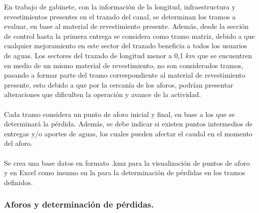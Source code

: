 \documentclass[]{article}
\begin{document}
En trabajo de gabinete, con la información de la longitud, infraestructura y revestimientos presentes en el trazado del canal, se determinan los tramos a evaluar, en base al material de revestimiento presente. Además, desde la sección de control hasta la primera entrega se considera como tramo matriz, debido a que cualquier mejoramiento en este sector del trazado beneficia a todos los usuarios de aguas. Los sectores del trazado de longitud menor a 0,1 $km$ que se encuentren en medio de un mismo material de revestimiento, no son considerados tramos, pasando a formar parte del tramo correspondiente al material de revestimiento presente, esto debido a que por la cercanía de los aforos, podrían presentar alteraciones que dificulten la operación y avance de la actividad. \\
\\
Cada tramo considera un punto de aforo inicial y final, en base a los que se determinará la pérdida. Además, se debe indicar si existen puntos intermedios de entregas y/o aportes de aguas, los cuales pueden afectar el caudal en el momento del aforo. \\
\\
Se crea una base datos en formato .kmz para la visualización de puntos de aforo y en Excel como insumo en la para la determinación de pérdidas en los tramos definidos.

\subsubsection{Aforos y determinación de pérdidas.}
\end{document}
